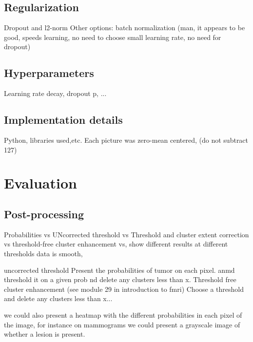 	\subsection{Regularization}
Dropout and l2-norm
Other options: batch normalization (man, it appears to be good, speeds learning, no need to choose small learning rate, no need for dropout)


	\subsection{Hyperparameters}
	Learning rate decay, dropout p, ...

	\subsection{Implementation details}
	Python, libraries used,etc.
	Each picture was zero-mean centered, (do not subtract 127)

\section{Evaluation}


\subsection{Post-processing}
Probabilities vs UNcorrected threshold vs Threshold and cluster extent correction vs threshold-free cluster enhancement vs, show different results at different thresholds
data is smooth, 

uncorrected threshold
Present the probabilities of tumor on each pixel. anmd threshold it on a given prob nd delete any clusters less than x.
Threshold free cluster enhancement (see module 29 in introduction to fmri)
Choose a threshold and delete any clusters less than x...

we could also present a heatmap with the different probabilities in each pixel of the image, for instance on mammograms we could present a grayscale image of whether a lesion is present.


